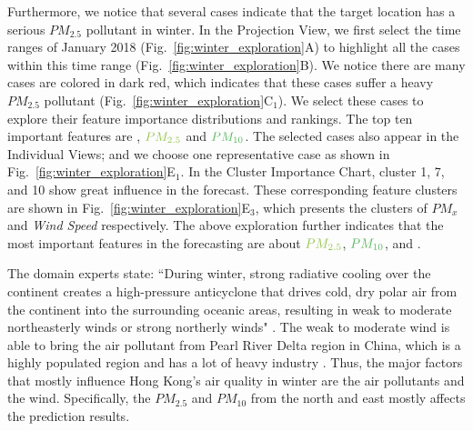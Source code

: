 Furthermore, we notice that several cases indicate that the target location has a serious $PM_{2.5}$ pollutant in winter. 
In the Projection View, we first select the time ranges of January 2018 (Fig.~\ref{fig:winter_exploration}A) to highlight all the cases within this time range (Fig.~\ref{fig:winter_exploration}B). 
We notice there are many cases are colored in dark red, which indicates that these cases suffer a heavy $PM_{2.5}$ pollutant (Fig.~\ref{fig:winter_exploration}C$_1$).
We select these cases to explore their feature importance distributions and rankings.
The top ten important features are \textit{\color{WINDColor}{Wind Speed}}, $\color{PM25Color}{PM_{2.5}}$ and $\color{PM10Color}{PM_{10}}$.
The selected cases also appear in the Individual Views; and we choose one representative case as shown in Fig.~\ref{fig:winter_exploration}E$_1$. 
In the Cluster Importance Chart, cluster 1, 7, and 10 show great influence in the forecast. 
These corresponding feature clusters are shown in Fig.~\ref{fig:winter_exploration}E$_3$, which presents the clusters of $PM_x$ and \textit{Wind Speed} respectively. 
The above exploration further indicates that the most important features in the forecasting are about $\color{PM25Color}{PM_{2.5}}$, $\color{PM10Color}{PM_{10}}$, and \textit{\color{WINDColor}{Wind Speed}}. 


The domain experts state: ``During winter, strong radiative cooling over the continent creates a high-pressure anticyclone that drives cold, dry polar air from the continent into the surrounding oceanic areas, resulting in weak to moderate northeasterly winds or strong northerly winds" \cite{louie2005seasonal, murakami1979winter}. 
The weak to moderate wind is able to bring the air pollutant from Pearl River Delta region in China, which is a highly populated region and has a lot of heavy industry \cite{cao2003characteristics}.
Thus, the major factors that mostly influence Hong Kong's air quality in winter are the air pollutants and the wind.
Specifically, the $PM_{2.5}$ and $PM_{10}$ from the north and east mostly affects the prediction results. 

